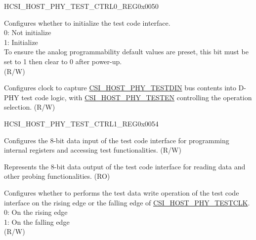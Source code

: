\begin{register}{H}{CSI\_HOST\_PHY\_TEST\_CTRL0\_REG}{0x0050}\label{regdesc:CSIHOSTPHYTESTCTRL0REG}
%
%
%
\regnewline%
\begin{regdesc}\begin{reglist}
\label{fielddesc:CSIHOSTPHYTESTCLR}\item [CSI\_HOST\_PHY\_TESTCLR] Configures whether to initialize the test code interface. \\
0: Not initialize\\
1: Initialize\\
To ensure the analog programmability default values are preset, this bit must be set to 1 then clear to 0 after power-up.\\
(R/W)
\label{fielddesc:CSIHOSTPHYTESTCLK}\item [CSI\_HOST\_PHY\_TESTCLK] Configures clock to capture \hyperref[fielddesc:CSIHOSTPHYTESTDIN]{CSI\_HOST\_PHY\_TESTDIN} bus contents into D-PHY test code logic, with \hyperref[fielddesc:CSIHOSTPHYTESTEN]{CSI\_HOST\_PHY\_TESTEN} controlling the operation selection. (R/W)
\end{reglist}\end{regdesc}
\end{register}


\begin{register}{H}{CSI\_HOST\_PHY\_TEST\_CTRL1\_REG}{0x0054}\label{regdesc:CSIHOSTPHYTESTCTRL1REG}
%
%
%
%
\regnewline%
\begin{regdesc}\begin{reglist}
\label{fielddesc:CSIHOSTPHYTESTDIN}\item [CSI\_HOST\_PHY\_TESTDIN] Configures the 8-bit data input of the test code interface for programming internal registers and accessing test functionalities. (R/W)
\label{fielddesc:CSIHOSTPHYTESTDOUT}\item [CSI\_HOST\_PHY\_TESTDOUT] Represents the 8-bit data output of the test code interface for reading data and other probing functionalities. (RO)
\label{fielddesc:CSIHOSTPHYTESTEN}\item [CSI\_HOST\_PHY\_TESTEN] Configures whether to performs the test data write operation of the test code interface on the rising edge or the falling edge of  \hyperref[fielddesc:CSIHOSTPHYTESTCLK]{CSI\_HOST\_PHY\_TESTCLK}. \\
0: On the rising edge \\
1: On the falling edge \\
(R/W)
\end{reglist}\end{regdesc}
\end{register}


